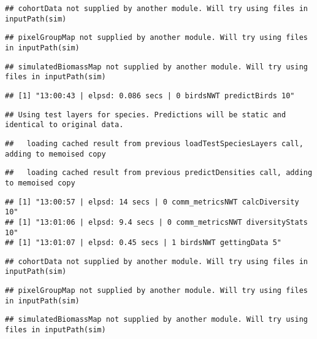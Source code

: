 \documentclass[]{article}
\begin{document}
\begin{verbatim}
## cohortData not supplied by another module. Will try using files in inputPath(sim)
\end{verbatim}

\begin{verbatim}
## pixelGroupMap not supplied by another module. Will try using files in inputPath(sim)
\end{verbatim}

\begin{verbatim}
## simulatedBiomassMap not supplied by another module. Will try using files in inputPath(sim)
\end{verbatim}

\begin{verbatim}
## [1] "13:00:43 | elpsd: 0.086 secs | 0 birdsNWT predictBirds 10"
\end{verbatim}

\begin{verbatim}
## Using test layers for species. Predictions will be static and identical to original data.
\end{verbatim}

\begin{verbatim}
##   loading cached result from previous loadTestSpeciesLayers call, adding to memoised copy
\end{verbatim}

\begin{verbatim}
##   loading cached result from previous predictDensities call, adding to memoised copy
\end{verbatim}

\begin{verbatim}
## [1] "13:00:57 | elpsd: 14 secs | 0 comm_metricsNWT calcDiversity 10"
## [1] "13:01:06 | elpsd: 9.4 secs | 0 comm_metricsNWT diversityStats 10"
## [1] "13:01:07 | elpsd: 0.45 secs | 1 birdsNWT gettingData 5"
\end{verbatim}

\begin{verbatim}
## cohortData not supplied by another module. Will try using files in inputPath(sim)
\end{verbatim}

\begin{verbatim}
## pixelGroupMap not supplied by another module. Will try using files in inputPath(sim)
\end{verbatim}

\begin{verbatim}
## simulatedBiomassMap not supplied by another module. Will try using files in inputPath(sim)
\end{verbatim}
\end{document}
